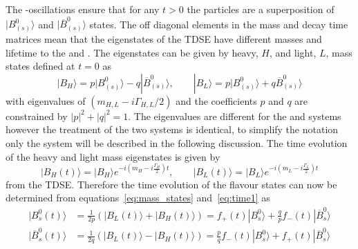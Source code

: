 {The \bsd-\barbsd oscillations ensure that for any $t>0$ the particles are a superposition of $| B^0_{(s)} \rangle$ and $| \overline{B}^0_{(s)} \rangle$ states. The off diagonal elements in the mass and decay time matrices mean that the eigenstates of the TDSE have different masses and lifetime to the \bsd and \barbsd. The eigenstates can be given by heavy, $H$, and light, $L$, mass states defined at $t=0$ as
\begin{equation}
| B_H \rangle = p | B^0_{(s)} \rangle - q |\overline{B}^0_{(s)} \rangle, \qquad |B_L \rangle = p  | B^0_{(s)} \rangle + q \overline{B}^0_{(s)} \rangle
\label{eq:mass_states}
\end{equation}
with eigenvalues of $(m_{H,L} - i\Gamma_{H,L}/2)$ and the coefficients $p$ and $q$ are constrained by $|p|^2 + |q|^2 = 1$. The eigenvalues are different for the \bd and \bs systems however the treatment of the two systems is identical, to simplify the notation only the \bs system will be described in the following discussion.
The time evolution of the heavy and light mass eigenstates is given by
\begin{equation}
  | B_H (t)\rangle = | B_H \rangle e^{-i(m_H - i\frac{\Gamma_H}{2})t}, \qquad | B_L (t)\rangle = | B_L \rangle e^{-i(m_L - i\frac{\Gamma_L}{2})t}
\label{eq:time1}
\end{equation}
from the TDSE. Therefore the time evolution of the flavour states can now be determined from equations~\ref{eq:mass_states} and~\ref{eq:time1} as
\begin{align}
| B^{0}_{s}(t) \rangle &= \frac{1}{2p}\left(|B_{L}(t)\rangle + |B_{H}(t) \rangle \right)  = f_{+}(t) |B^{0}_{s} \rangle + \frac{q}{p}f_{-}(t) |\overline{B}^{0}_{s}\rangle \\
| \overline{B}^{0}_{s}(t) \rangle &= \frac{1}{2q}\left(|B_{L}(t)\rangle - |B_{H}(t) \rangle \right)  = \frac{p}{q}f_{-}(t) |B^{0}_{s} \rangle+ f_{+}(t) |\overline{B}^{0}_{s}\rangle 
\end{align}

}

